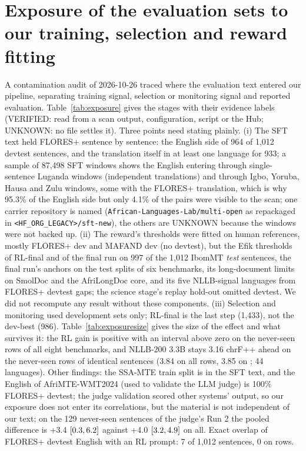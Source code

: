 \section{Exposure of the evaluation sets to our training, selection and reward fitting}\label{app:exposure}
A contamination audit of 2026-10-26 traced where the evaluation text entered our pipeline, separating training signal, selection or monitoring signal and reported evaluation. Table~\ref{tab:exposure} gives the stages with their evidence labels (VERIFIED: read from a scan output, configuration, script or the Hub; UNKNOWN: no file settles it). Three points need stating plainly. (i) The SFT text held FLORES+ sentence by sentence: the English side of 964 of 1,012 devtest sentences, and the translation itself in at least one language for 933; a sample of 87,498 SFT windows shows the English entering through single-sentence Luganda windows (independent translations) and through Igbo, Yoruba, Hausa and Zulu windows, some with the FLORES+ translation, which is why 95.3\% of the English side but only 4.1\% of the pairs were visible to the scan; one carrier repository is named (\texttt{African-Languages-Lab/multi-open} as repackaged in \texttt{<HF_ORG_LEGACY>/sft-new}), the others are UNKNOWN because the windows were not backed up. (ii) The reward's thresholds were fitted on human references, mostly FLORES+ dev and MAFAND dev (no devtest), but the Efik thresholds of RL-final and of the final run on 997 of the 1,012 IbomMT \emph{test} sentences, the final run's anchors on the test splits of six benchmarks, its long-document limits on SmolDoc and the AfriLongDoc core, and its five NLLB-signal languages from FLORES+ devtest gaps; the science stage's replay hold-out omitted devtest. We did not recompute any result without these components. (iii) Selection and monitoring used development sets only; RL-final is the last step (1,433), not the dev-best (986). Table~\ref{tab:exposuresize} gives the size of the effect and what survives it: the RL gain is positive with an interval above zero on the never-seen rows of all eight benchmarks, and NLLB-200 3.3B stays 3.16 chrF++ ahead on the never-seen rows of identical sentences (3.84 on all rows, 3.85 on \nopair{}; 44 languages). Other findings: the SSA-MTE train split is in the SFT text, and the English of AfriMTE-WMT2024 (used to validate the LLM judge) is 100\% FLORES+ devtest; the judge validation scored other systems' output, so our exposure does not enter its correlations, but the material is not independent of our text; on the 129 never-seen sentences of the judge's Run 2 the pooled difference is +3.4 $[0.3, 6.2]$ against +4.0 $[3.2, 4.9]$ on all. Exact overlap of FLORES+ devtest English with an RL prompt: 7 of 1,012 sentences, 0 on \clean{} rows.



